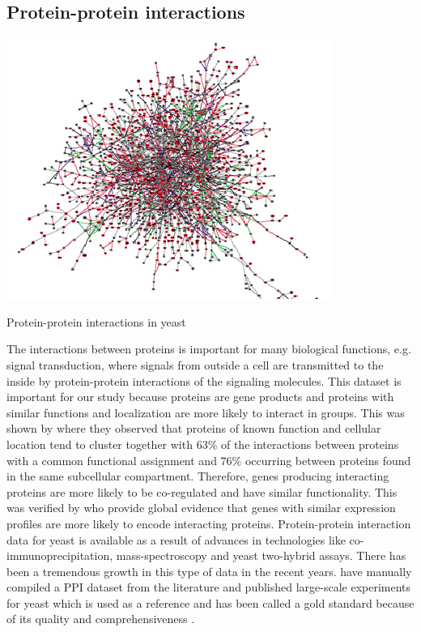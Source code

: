 \subsection{Protein-protein interactions}
\begin{floatingfigure}[p]{0.5\textwidth}
\includegraphics[scale=1.25]{introduction/ppi.eps}
\caption{Protein-protein interactions in yeast}
\label{fig:ppi_yeast}
\end{floatingfigure}
The interactions between proteins is important for many biological functions, e.g. signal transduction, where signals from outside a cell are transmitted to the inside by protein-protein interactions of the signaling molecules. This dataset is important for our study because proteins are gene products and proteins with similar functions and localization are more likely to interact in groups. This was shown by \citet{schwikowski2000protein} where they observed that proteins of known function and cellular location tend to cluster together with 63\% of the interactions between proteins with a common functional assignment and 76\% occurring between proteins found in the same subcellular compartment. Therefore, genes producing interacting proteins are more likely to be co-regulated and have similar functionality. This was verified by \citet{ge01correlation} who provide global evidence that genes with similar expression profiles are more likely to encode interacting proteins. Protein-protein interaction data for yeast is available as a result of advances in technologies like co-immunoprecipitation, mass-spectroscopy and yeast two-hybrid assays. There has been a tremendous growth in this type of data in the recent years. \citet{Gueldener2006MPact} have manually compiled a \ac{PPI} dataset from the literature and published large-scale experiments for yeast which is used as a reference and has been called a gold standard because of its quality and comprehensiveness \citep{yu2004annotation}.
 

